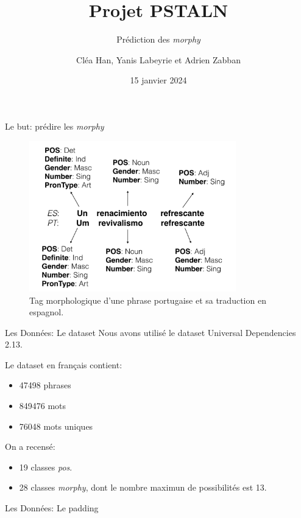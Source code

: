 \documentclass[11pt]{beamer}
\title{Projet PSTALN}
\subtitle{Prédiction des \textit{morphy}}
\author{Cléa Han, Yanis Labeyrie et Adrien Zabban}
\date{15 janvier 2024}
\begin{document}
\maketitle

\begin{frame}{Le but: prédire les \textit{morphy}}
    \begin{figure}[b]
        \centering
        \includegraphics[width=0.8\textwidth]{morphy.png}
        \caption{Tag morphologique d'une phrase portugaise et sa traduction en espagnol.}
    \end{figure}
\end{frame}

\begin{frame}{Les Données: Le dataset}
    Nous avons utilisé le dataset Universal Dependencies 2.13.

    Le dataset en français contient:
    \begin{itemize}
        \item 47498 phrases
        \item 849476 mots
        \item 76048 mots uniques
    \end{itemize}

    On a recensé:
    \begin{itemize}
        \item 19 classes \textit{pos}.
        \item 28 classes \textit{morphy}, dont le nombre maximun de possibilités est 13.
    \end{itemize}
\end{frame}

\begin{frame}{Les Données: Le padding}

\end{frame}
\end{document}

